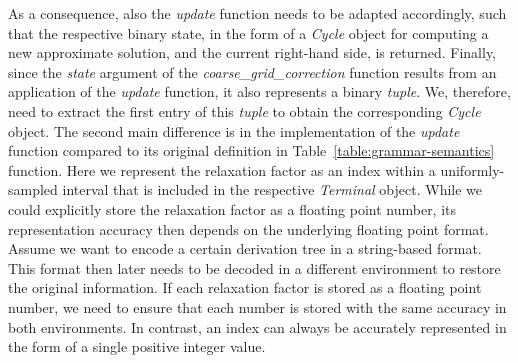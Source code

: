 As a consequence, also the \emph{update} function needs to be adapted accordingly, such that the respective binary state, in the form of a \emph{Cycle} object for computing a new approximate solution, and the current right-hand side, is returned.
Finally, since the \emph{state} argument of the \emph{coarse\_grid\_correction} function results from an application of the \emph{update} function, it also represents a binary \emph{tuple}.
We, therefore, need to extract the first entry of this \emph{tuple} to obtain the corresponding \emph{Cycle} object.
The second main difference is in the implementation of the \emph{update} function compared to its original definition in Table~\ref{table:grammar-semantics} function.
Here we represent the relaxation factor as an index within a uniformly-sampled interval that is included in the respective \emph{Terminal} object.
While we could explicitly store the relaxation factor as a floating point number, its representation accuracy then depends on the underlying floating point format.
Assume we want to encode a certain derivation tree in a string-based format.
This format then later needs to be decoded in a different environment to restore the original information.
If each relaxation factor is stored as a floating point number, we need to ensure that each number is stored with the same accuracy in both environments.
In contrast, an index can always be accurately represented in the form of a single positive integer value.

